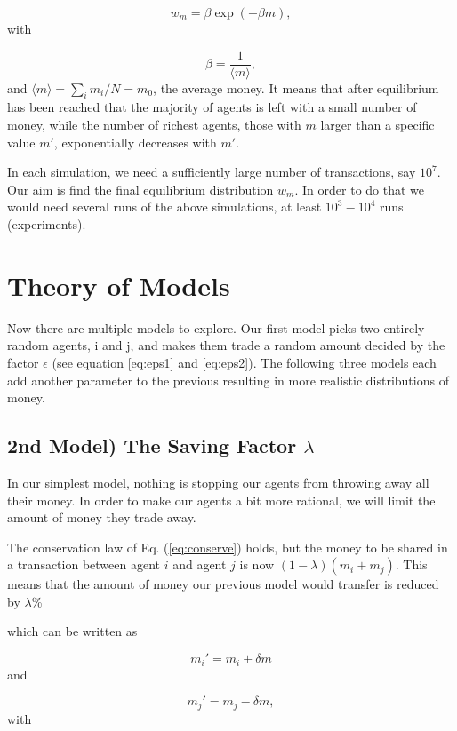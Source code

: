 \documentclass[10pt, a4paper]{article}
\begin{document}
\begin{equation*}
w_m=\beta \exp{(-\beta m)},
\end{equation*}
with

\begin{equation*}
\beta = \frac{1}{\langle m\rangle},
\end{equation*}
and $\langle m\rangle=\sum_i m_i/N=m_0$, the average money.
It means that after equilibrium has been reached that the majority of agents is left with a small
number of money, while the number of richest agents, those with $m$ larger than a specific value $m'$,
exponentially decreases with $m'$.

In each simulation, we need a sufficiently large number of transactions, say $10^7$. Our aim is find the final equilibrium distribution $w_m$. In order to do that we would need
several runs of the above simulations, at least $10^3-10^4$ runs (experiments).
\section{Theory of Models}
Now there are multiple models to explore. Our first model picks two entirely random agents, i and j, and makes them trade a random amount decided by the factor $\epsilon$ (see equation \ref{eq:eps1} and \ref{eq:eps2}).
The following three models each add another parameter to the previous resulting in more realistic distributions of money.
\subsection{2nd Model) The Saving Factor $\lambda$}
In our simplest model, nothing is stopping our agents from throwing away all their money. In order to make our agents a bit more rational, we will limit the amount of money they trade away.


The conservation law of Eq. (\ref{eq:conserve}) holds, but the money to be shared in a transaction between
agent $i$ and agent $j$ is now $(1-\lambda)(m_i+m_j)$. This means that the amount of money our previous model would transfer is reduced by $\lambda$\%

which can be written as

\begin{equation}
  m_i'=m_i+\delta m
  \end{equation}
  and

\begin{equation}
  m_j'=m_j-\delta m,
  \end{equation}
  with
\end{document}
